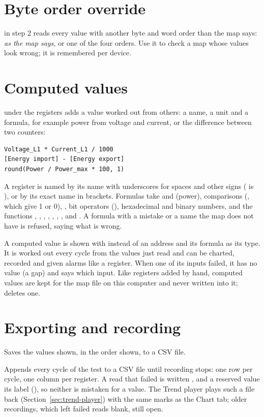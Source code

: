 \section{Byte order override}

 in step 2 reads every value with another byte and word
order than the map says: \emph{as the map says}, or one of the four orders.
Use it to check a map whose values look wrong; it is remembered per device.

\section{Computed values}
\label{sec:computed}

 under the registers adds a value worked out from
others: a name, a unit and a formula, for example power from voltage and
current, or the difference between two counters:

\begin{lstlisting}
Voltage_L1 * Current_L1 / 1000
[Energy import] - [Energy export]
round(Power / Power_max * 100, 1)
\end{lstlisting}

A register is named by its name with underscores for spaces and other signs
( is ), or by its exact name in brackets.
Formulas take \val{+ - * / \%} and \val{**} (power), comparisons
(\val{< <= > >= == !=}, which give 1 or 0), \val{\&\& ||}, bit operators
(\val{\& | \^{} ~ << >>}), hexadecimal and binary numbers, and the functions
, , , , , ,
,  and . A formula with a mistake or a name the
map does not have is refused, saying what is wrong.

A computed value is shown with  instead of an address and its formula
as its type. It is worked out every cycle from the values just read and can be
charted, recorded and given alarms like a register. When one of its inputs
failed, it has no value (a gap) and says which input. Like registers added by
hand, computed values are kept for the map file on this computer and never
written into it;  deletes one.

\section{Exporting and recording}

\begin{description}[style=nextline, leftmargin=0pt, font=\intermedium]
  \item[\ui{Export…}] Saves the values shown, in the order shown, to a CSV
    file.
  \item[\ui{Record…}] Appends every cycle of the test to a CSV file until
    recording stops: one row per cycle, one column per register. A read
    that failed is written , and a reserved value its label
    (), so neither is mistaken for a value. The Trend
    player plays such a file back (Section~\ref{sec:trend-player}) with the
    same marks as the Chart tab; older recordings, which left failed reads
    blank, still open.
\end{description}

